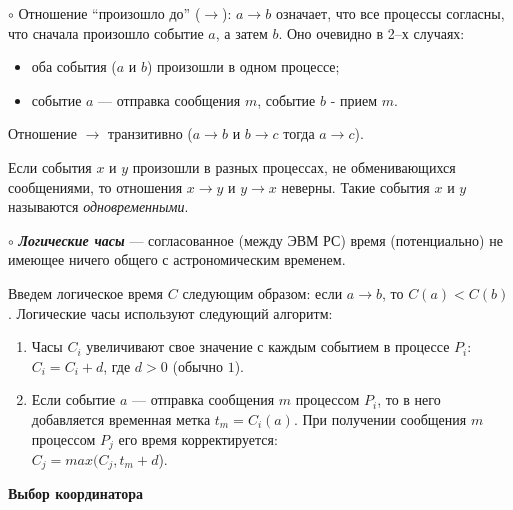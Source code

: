 $\circ$
Отношение ``произошло до'' ($\rightarrow$): $a \rightarrow b$ означает, что все процессы согласны, что сначала произошло событие $a$, а затем $b$.
Оно очевидно в 2--х случаях:
\vspace{-0.7em}
\begin{itemize}
    \setlength\itemsep{-0.4em}
    \item {}оба события ($a$ и $b$) произошли в одном процессе;
    \item событие $a$ --- отправка сообщения $m$, событие $b$ - прием $m$.
\end{itemize}

Отношение $\rightarrow$ транзитивно ($a \rightarrow b$ и $b \rightarrow c$ тогда $a \rightarrow c$).

Если события $x$ и $y$ произошли в разных процессах, не обменивающихся сообщениями, то отношения $x \rightarrow y$ и $y \rightarrow x$ неверны.
Такие события $x$ и $y$ называются \textit{одновременными}.

$\circ$
\textbf{\textit{Логические часы}} --- согласованное (между ЭВМ РС) время (потенциально) не имеющее ничего общего с астрономическим временем.

Введем логическое время $C$ следующим образом: если $a \rightarrow b$, то $C(a) < C(b)$.
Логические часы используют следующий алгоритм:
\begin{enumerate}
\item
Часы $C_i$ увеличивают свое значение с каждым событием в процессе $P_i$:
$C_i = C_i + d$, где $d > 0$ (обычно $1$).

\item
Если событие $a$ --- отправка сообщения $m$ процессом $P_i$, то в него добавляется временная метка $t_m=C_i(a)$.
При получении сообщения $m$ процессом $P_j$ его время корректируется: \\ $C_j = max(C_j,t_m + d$).
\end{enumerate}

\centerline{\textbf{Выбор координатора}}

